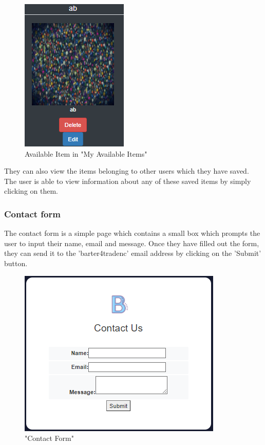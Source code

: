 \begin{figure}[h]
\renewcommand\thefigure{4.6}
\centering
\includegraphics[scale=.6]{img/fe_editdelete.PNG}
\caption{Available Item in "My Available Items"}
\label{AvailableItem}
\end{figure}

They can also view the items belonging to other users which they have saved. The user is able to view information about any of these saved items by simply clicking on them. 

\subsubsection{Contact form}
The contact form is a simple page which contains a small box which prompts the user to input their name, email and message. Once they have filled out the form, they can send it to the 'barter4tradenc' email address by clicking on the 'Submit' button.

\begin{figure}[h]
\renewcommand\thefigure{4.7}
\centering
\includegraphics[scale=.6]{img/fe_contact.PNG}
\caption{"Contact Form"}
\label{ContactForm}
\end{figure}

